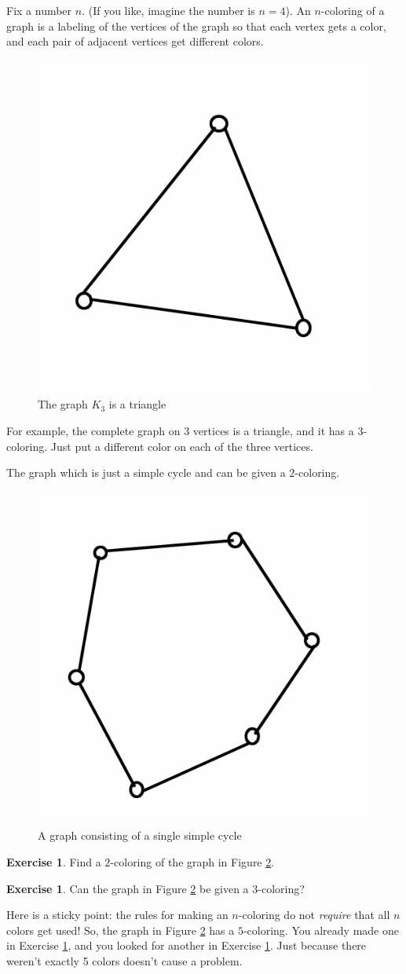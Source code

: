 \documentclass[12pt,letterpaper]{article}
\theoremstyle{definition}
\newtheorem{exercise}[question]{Exercise}
\begin{document}
Fix a number $n$. (If you like, imagine the number is $n=4$). An $n$-coloring of a graph is a labeling of the vertices
of the graph so that each vertex gets a color, and each pair of adjacent vertices get different colors.

\begin{figure}[h]
\centering
\includegraphics[width=.3\textwidth]{images/k3.png}
\caption{The graph $K_3$ is a triangle}
\label{fig:k3}
\end{figure}

For example, the complete graph on 3 vertices is a triangle, and it has a $3$-coloring. Just put a different color 
on each of the three vertices.

The graph which is just a simple cycle and can be given a $2$-coloring.
\begin{figure}[h]
\centering
\includegraphics[width=.3\textwidth]{images/cycle.png}
\caption{A graph consisting of a single simple cycle}
\label{fig:cycle}
\end{figure}

\begin{exercise}\label{ex:2color}
Find a $2$-coloring of the graph in Figure \ref{fig:cycle}.
\end{exercise}

\begin{exercise}\label{ex:3color}
Can the graph in Figure \ref{fig:cycle} be given a $3$-coloring?
\end{exercise}

Here is a sticky point: the rules for making an $n$-coloring do not \emph{require} that all $n$ colors get used!
So, the graph in Figure \ref{fig:cycle} has a $5$-coloring. You already made one in Exercise \ref{ex:2color}, and 
you looked for another in Exercise \ref{ex:3color}. Just because there weren't exactly 5 colors doesn't cause a 
problem.
\end{document}
